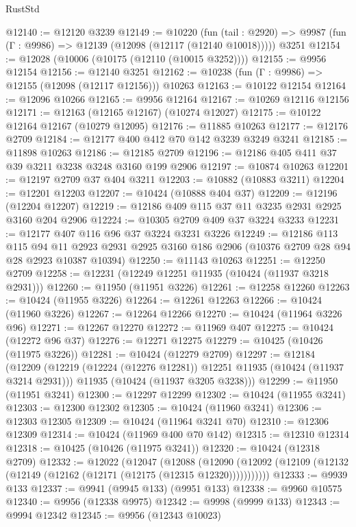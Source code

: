 \begin{lexlean}{RustStd}
\begin{coremodule}
@12140 := @12120 @3239
@12149 := @10220
    (fun (tail : @2920) => @9987 (fun (Γ : @9986) => @12139 (@12098 (@12117 (@12140 @10018)))))
    @3251
@12154 := @12028 (@10006 (@10175 (@12110 (@10015 @3252))))
@12155 := @9956 @12154
@12156 := @12140 @3251
@12162 := @10238 (fun (Γ : @9986) => @12155 (@12098 (@12117 @12156))) @10263
@12163 := @10122 @12154
@12164 := @12096 @10266
@12165 := @9956 @12164
@12167 := @10269 @12116 @12156
@12171 := @12163 (@12165 @12167) (@10274 @12027)
@12175 := @10122 @12164 @12167 (@10279 @12095)
@12176 := @11885 @10263
@12177 := @12176 @2709
@12184 := @12177 @400 @412 @70 @142 @3239 @3249 @3241
@12185 := @11898 @10263
@12186 := @12185 @2709
@12196 := @12186 @405 @411 @37 @39 @3211 @3238 @3248 @3160 @199 @2906
@12197 := @10874 @10263
@12201 := @12197 @2709 @37 @404 @3211
@12203 := @10882 (@10883 @3211)
@12204 := @12201 @12203
@12207 := @10424 (@10888 @404 @37)
@12209 := @12196 (@12204 @12207)
@12219 := @12186 @409 @115 @37 @11 @3235 @2931 @2925 @3160 @204 @2906
@12224 := @10305 @2709 @409 @37 @3224 @3233
@12231 := @12177 @407 @116 @96 @37 @3224 @3231 @3226
@12249 := @12186
    @113
    @115
    @94
    @11
    @2923
    @2931
    @2925
    @3160
    @186
    @2906
    (@10376 @2709 @28 @94 @28 @2923 @10387 @10394)
@12250 := @11143 @10263
@12251 := @12250 @2709
@12258 := @12231 (@12249 @12251 @11935 (@10424 (@11937 @3218 @2931)))
@12260 := @11950 (@11951 @3226)
@12261 := @12258 @12260
@12263 := @10424 (@11955 @3226)
@12264 := @12261 @12263
@12266 := @10424 (@11960 @3226)
@12267 := @12264 @12266
@12270 := @10424 (@11964 @3226 @96)
@12271 := @12267 @12270
@12272 := @11969 @407
@12275 := @10424 (@12272 @96 @37)
@12276 := @12271 @12275
@12279 := @10425 (@10426 (@11975 @3226))
@12281 := @10424 (@12279 @2709)
@12297 := @12184
    (@12209
      (@12219 (@12224 (@12276 @12281)) @12251 @11935 (@10424 (@11937 @3214 @2931)))
      @11935
      (@10424 (@11937 @3205 @3238)))
@12299 := @11950 (@11951 @3241)
@12300 := @12297 @12299
@12302 := @10424 (@11955 @3241)
@12303 := @12300 @12302
@12305 := @10424 (@11960 @3241)
@12306 := @12303 @12305
@12309 := @10424 (@11964 @3241 @70)
@12310 := @12306 @12309
@12314 := @10424 (@11969 @400 @70 @142)
@12315 := @12310 @12314
@12318 := @10425 (@10426 (@11975 @3241))
@12320 := @10424 (@12318 @2709)
@12332 := @12022
    (@12047
      (@12088
        (@12090 (@12092 (@12109 (@12132 (@12149 (@12162 (@12171 (@12175 (@12315 @12320)))))))))))
@12333 := @9939 @133
@12337 := @9941 (@9945 @133) (@9951 @133)
@12338 := @9960 @10575
@12340 := @9956 (@12338 @9975)
@12342 := @9998 (@9999 @133)
@12343 := @9994 @12342
@12345 := @9956 (@12343 @10023)

\end{coremodule}
\end{lexlean}
